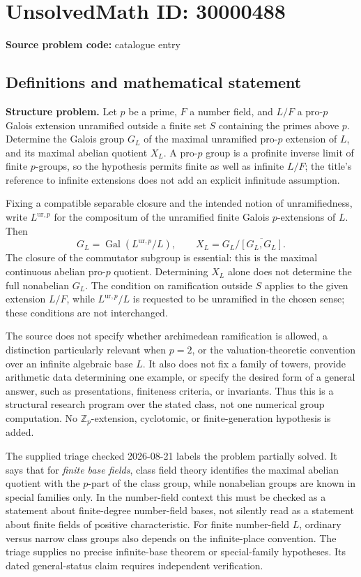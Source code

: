 \documentclass[11pt]{article}
\newcommand{\Z}{\mathbb{Z}}
\begin{document}
\section*{UnsolvedMath ID: 30000488}
\textbf{Source problem code:} catalogue entry
\subsection{Definitions and mathematical statement}
\textbf{Structure problem.} Let \(p\) be a prime, \(F\) a number field, and \(L/F\) a pro-\(p\) Galois extension unramified outside a finite set \(S\) containing the primes above \(p\). Determine the Galois group \(G_L\) of the maximal unramified pro-\(p\) extension of \(L\), and its maximal abelian quotient \(X_L\). A pro-\(p\) group is a profinite inverse limit of finite \(p\)-groups, so the hypothesis permits finite as well as infinite \(L/F\); the title's reference to infinite extensions does not add an explicit infinitude assumption.\par Fixing a compatible separable closure and the intended notion of unramifiedness, write \(L^{\mathrm{ur},p}\) for the compositum of the unramified finite Galois \(p\)-extensions of \(L\). Then\[G_L=\operatorname{Gal}(L^{\mathrm{ur},p}/L),\qquad X_L=G_L/\overline{[G_L,G_L]}.\] The closure of the commutator subgroup is essential: this is the maximal continuous abelian pro-\(p\) quotient. Determining \(X_L\) alone does not determine the full nonabelian \(G_L\). The condition on ramification outside \(S\) applies to the given extension \(L/F\), while \(L^{\mathrm{ur},p}/L\) is requested to be unramified in the chosen sense; these conditions are not interchanged.\par The source does not specify whether archimedean ramification is allowed, a distinction particularly relevant when \(p=2\), or the valuation-theoretic convention over an infinite algebraic base \(L\). It also does not fix a family of towers, provide arithmetic data determining one example, or specify the desired form of a general answer, such as presentations, finiteness criteria, or invariants. Thus this is a structural research program over the stated class, not one numerical group computation. No \(\Z_p\)-extension, cyclotomic, or finite-generation hypothesis is added.\par The supplied triage checked 2026-08-21 labels the problem partially solved. It says that for \emph{finite base fields}, class field theory identifies the maximal abelian quotient with the \(p\)-part of the class group, while nonabelian groups are known in special families only. In the number-field context this must be checked as a statement about finite-degree number-field bases, not silently read as a statement about finite fields of positive characteristic. For finite number-field \(L\), ordinary versus narrow class groups also depends on the infinite-place convention. The triage supplies no precise infinite-base theorem or special-family hypotheses. Its dated general-status claim requires independent verification.
\end{document}
